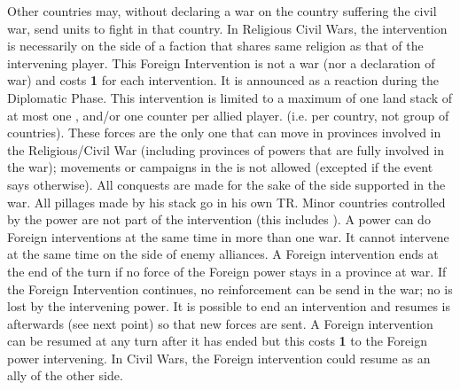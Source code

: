 \label{chDiplo:Foreign Intervention}
Other countries may, without declaring a war on the country suffering the
civil war, send units to fight in that country. In Religious Civil Wars, the
intervention is necessarily on the side of a faction that shares same religion
as that of the intervening player.
\bparag This Foreign Intervention is not a war (nor a declaration of war) and
costs {\bf 1 \STAB} for each intervention.
It is announced as a reaction during the Diplomatic Phase.
\bparag
This intervention is limited to a maximum of one land stack of at most one
\ARMY\faceplus, and/or one \FLEET counter per allied player.  (i.e. per
country, not group of countries).  These forces are the only one that can move
in provinces involved in the Religious/Civil War (including provinces of
powers that are fully involved in the war); movements or campaigns in the
\ROTW is not allowed (excepted if the event says otherwise).  All conquests
are made for the sake of the side supported in the war.  All pillages made by
his stack go in his own TR.
\bparag Minor countries controlled by the power are not part of the
intervention (this includes \VASSAL).
\bparag A power can do Foreign interventions at the same time in more than one
war. It cannot intervene at the same time on the side of enemy alliances.
\bparag A Foreign intervention ends at the end of the turn if no force of the
Foreign power stays in a province at war.
\bparag If the Foreign Intervention continues, no reinforcement can be send in
the war; no \STAB is lost by the intervening power.  It is possible to end an
intervention and resumes is afterwards (see next point) so that new forces are
sent.
\bparag A Foreign intervention can be resumed at any turn after it has ended
but this costs {\bf 1} \STAB to the Foreign power intervening. In Civil Wars,
the Foreign intervention could resume as an ally of the other side.


